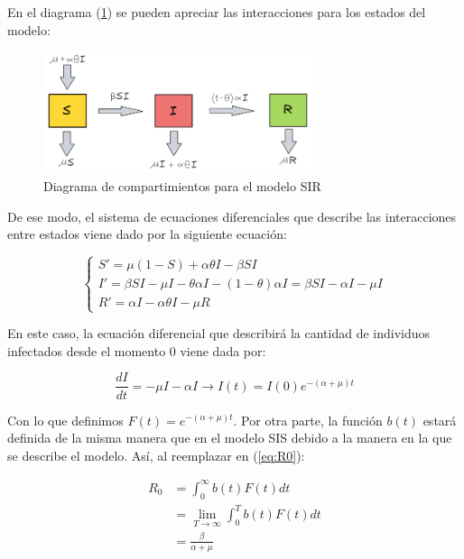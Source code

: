 En el diagrama (\ref{fig:diagrama SIR}) se pueden apreciar las interacciones para los estados del modelo:

\begin{figure}[h]
  \centering
    \includegraphics[width=0.7\textwidth]{Imagenes/SIR_compartimientos.PNG}
  \caption{Diagrama de compartimientos para el modelo SIR}
  \label{fig:diagrama SIR}
\end{figure}

De ese modo, el sistema de ecuaciones diferenciales que describe las interacciones entre estados viene dado por la siguiente ecuación:

\begin{equation}\label{eq:Modelo SIR}
\left\{
\begin{array}{l}
S' = \mu(1 - S) + \alpha\theta I - \beta S I \\
I' = \beta S I - \mu I - \theta\alpha I - (1 - \theta)\alpha I = \beta S I - \alpha I - \mu I \\
R' = \alpha I - \alpha\theta I - \mu R
\end{array}
\right.
\end{equation}

En este caso, la ecuación diferencial que describirá la cantidad de individuos infectados desde el momento 0 viene dada por:

\begin{equation}\label{eq:Infectados en el tiempo I - SIR}
    \frac{dI}{dt}=-\mu I - \alpha I \longrightarrow I(t)=I(0)e^{-(\alpha+\mu)t}
\end{equation}

Con lo que definimos $F(t)=e^{-(\alpha+\mu)t}$. Por otra parte, la función $b(t)$ estará definida de la misma manera que en el modelo SIS debido a la manera en la que se describe el modelo. Así, al reemplazar en (\ref{eq:R0}):

\begin{align*}
R_0 &= \int_0^\infty b(t)F(t) dt \\
&= \lim_{T\to\infty} \int_0^T b(t)F(t) dt \\
&= \frac{\beta}{\alpha+\mu}
\end{align*}

